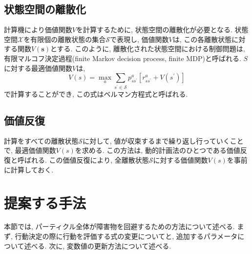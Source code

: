 \subsection{状態空間の離散化}
計算機により価値関数$V$を計算するために, 状態空間の離散化が必要となる. 
状態空間$\mathcal{X}$を有限個の離散状態の集合$\mathcal{S}$で表現し, 
価値関数$V$は, この各離散状態に対する関数$V(\bm{s})$とする. 
このように, 離散化された状態空間における制御問題は, 有限マルコフ決定過程(finite Markov decision process, finite MDP)と呼ばれる. 
$S$に対する最適価値関数$V$は, 
\begin{equation}
\label{bellman equation}
  V(s) = \max_{a} \sum_{s^{\prime} \in \mathcal{S}}
         p^{a}_{ss^{\prime}} \left[ r^{a}_{ss^{\prime}} + V(s^{\prime}) \right]
\end{equation}
で計算することができ, この式はベルマン方程式と呼ばれる. 



\subsection{価値反復}
計算をすべての離散状態$\mathcal{S}$に対して, 値が収束するまで繰り返し行っていくことで, 最適価値関数$V(s)$を求める. 
この方法は, 動的計画法のひとつである価値反復と呼ばれる. 
この価値反復により, 全離散状態$\mathcal{S}$に対する価値関数$V(s)$を事前に計算しておく. 


\section{提案する手法} \label{section:回避重み}
本節では, パーティクル全体が障害物を回避するための方法について述べる. 
まず, 行動決定の際に行動を評価する式の変更についてと, 追加するパラメータについて述べる. 
次に, 変数値の更新方法について述べる. 

